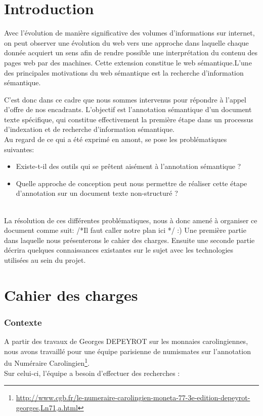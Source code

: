 \documentclass[a4paper, 11pt]{report}
\begin{document}
\part{Introduction}
Avec l'évolution de manière significative des volumes d'informations sur internet, on peut observer une évolution du web vers une approche dans laquelle chaque donnée acquiert un sens afin de rendre possible une interprétation du contenu des pages web par des machines. Cette extension constitue le web sémantique.L'une des principales motivations du web sémantique est la recherche d’information sémantique.

C'est donc dans ce cadre que nous sommes intervenus pour répondre à l'appel d'offre de nos encadrants. L'objectif est l'annotation sémantique d'un document texte spécifique, qui constitue effectivement la première étape dans un processus d'indexation et de recherche d'information sémantique.\\

Au regard de ce qui a été exprimé en amont, se pose les problématiques suivantes:
\begin{itemize}
\item Existe-t-il des outils qui se prêtent aisément à l'annotation sémantique ?
\item Quelle approche de conception peut nous permettre de réaliser cette étape d'annotation sur un document texte non-structuré ?
\end{itemize}
	~\\
	
La résolution de ces différentes problématiques, nous à donc amené à organiser ce document comme suit: /*Il faut caller notre plan ici */ :)
Une première partie dans laquelle nous présenterons le cahier des charges. Ensuite une seconde partie décrira quelques connaissances existantes sur le sujet avec les technologies utilisées au sein du projet.
\part{Cahier des charges}
	\section{Contexte}

A partir des travaux de Georges DEPEYROT sur les monnaies carolingiennes, nous avons travaillé pour une équipe parisienne de numismates sur l'annotation du Numéraire Carolingien\footnote{\url{http://www.cgb.fr/le-numeraire-carolingien-moneta-77-3e-edition-depeyrot-georges,Ln71,a.html}}.\\
Sur celui-ci, l'équipe a besoin d'effectuer des recherches :
\end{document}

